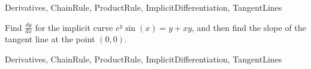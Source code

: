 	
\begin{tagblock}{Derivatives, ChainRule, ProductRule, ImplicitDifferentiation, TangentLines}
\begin{question}
	

Find $\frac{dy}{dx}$ for the implicit curve $e^y\sin(x)= y+xy$, and then find the slope of the tangent  line at the point $(0,0)$.



	
\begin{tags}
	    Derivatives, ChainRule, ProductRule, ImplicitDifferentiation, TangentLines
\end{tags}
	
\begin{diary}
\end{diary}
	
\begin{solution}
	   
\end{solution}
	
\end{question}

\end{tagblock}



